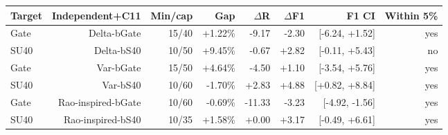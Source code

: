 \setlength{\tabcolsep}{3pt}\begin{tabular}{lrrrrrrr}\toprule
Target & Independent+C11 & Min/cap & Gap & $\Delta$R & $\Delta$F1 & F1 CI & Within 5\% \\\midrule
Gate & Delta-bGate & 15/40 & +1.22\% & -9.17 & -2.30 & [-6.24, +1.52] & yes \\
SU40 & Delta-bS40 & 10/50 & +9.45\% & -0.67 & +2.82 & [-0.11, +5.43] & no \\
Gate & Var-bGate & 15/50 & +4.64\% & -4.50 & +1.10 & [-3.54, +5.76] & yes \\
SU40 & Var-bS40 & 10/60 & -1.70\% & +2.83 & +4.88 & [+0.82, +8.84] & yes \\
Gate & Rao-inspired-bGate & 10/60 & -0.69\% & -11.33 & -3.23 & [-4.92, -1.56] & yes \\
SU40 & Rao-inspired-bS40 & 10/35 & +1.58\% & +0.00 & +3.17 & [-0.49, +6.61] & yes \\
\bottomrule\end{tabular}
